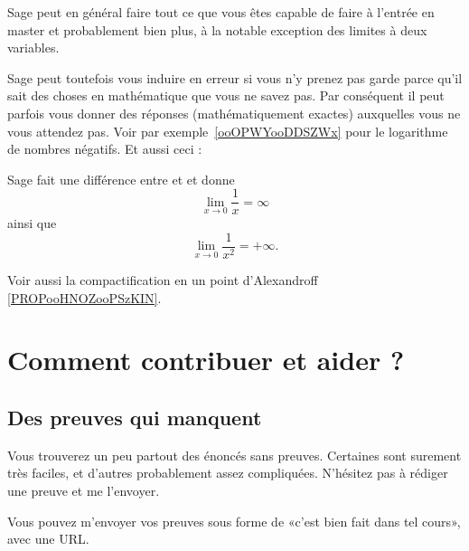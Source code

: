 Sage peut en général faire tout ce que vous êtes capable de faire à l'entrée en master et probablement bien plus, à la notable exception des limites à deux variables.

\begin{remark}
	Sage peut toutefois vous induire en erreur si vous n'y prenez pas garde parce qu'il sait des choses en mathématique que vous ne savez pas. Par conséquent il peut parfois vous donner des réponses (mathématiquement exactes) auxquelles vous ne vous attendez pas. Voir par exemple~\ref{ooOPWYooDDSZWx} pour le logarithme de nombres négatifs. Et aussi ceci :

	

	Sage fait une différence entre  et  et donne
	\begin{equation}
		\lim_{x\to 0} \frac{1}{ x }=\infty
	\end{equation}
	ainsi que
	\begin{equation}
		\lim_{x\to 0} \frac{1}{ x^2 }=+\infty.
	\end{equation}
\end{remark}

Voir aussi la compactification en un point d'Alexandroff \ref{PROPooHNOZooPSzKIN}.

\section{Comment contribuer et aider ?}
\label{SecooCKWWooBFgnea}

\subsection{Des preuves qui manquent}

Vous trouverez un peu partout des énoncés sans preuves. Certaines sont surement très faciles, et d'autres probablement assez compliquées. N'hésitez pas à rédiger une preuve et me l'envoyer.

Vous pouvez m'envoyer vos preuves sous forme de «c'est bien fait dans tel cours», avec une URL.

